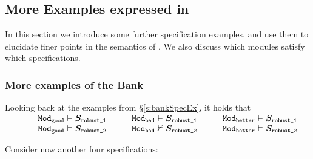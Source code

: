 \subsection{More Examples expressed in\Nec}
\label{s:expressiveness}

In this section we introduce some further specification examples, and use them to elucidate finer points
in the semantics of \Nec. We also  discuss which modules    satisfy  which specifications.

 \subsubsection{More examples of the Bank}
Looking back at the examples from  \S\ref{s:bankSpecEx},   it holds that
  \\
  $\begin{array}{llll}
  \ \  \ \ \ \ \ & \ModA \vDash  \SrobustA    \ \ \ \ \ \ & \ModB \vDash \SrobustA \ \ \ \ \ \
  &  \ModC \vDash \SrobustA
  \\
 &  \ModA \vDash  \SrobustB    \ \ \ \ \ & \ModB \nvDash \SrobustB \ \ \ \ \ 
  &  \ModC \vDash \SrobustB
  \end{array}$
 
 

 
Consider now another four \Nec specifications:
 
